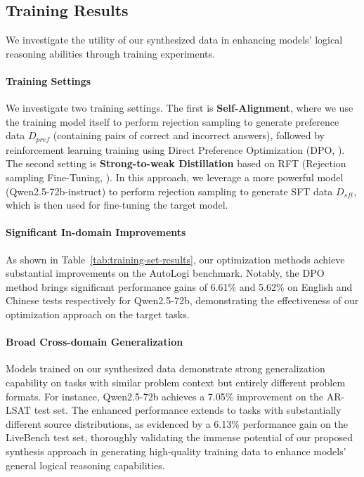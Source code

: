 \subsection{Training Results}
We investigate the utility of our synthesized data in enhancing models' logical reasoning abilities through training experiments.

\paragraph{Training Settings}
We investigate two training settings. The first is \textbf{Self-Alignment}, where we use the training model itself to perform rejection sampling to generate preference data $D_{pref}$ (containing pairs of correct and incorrect answers), followed by reinforcement learning training using Direct Preference Optimization (DPO, \citealp{rafailov2024directpreferenceoptimizationlanguage}).
The second setting is \textbf{Strong-to-weak Distillation} based on RFT (Rejection sampling Fine-Tuning,  \citealp{yuan2023scalingrelationshiplearningmathematical}). In this approach, we leverage a more powerful model (Qwen2.5-72b-instruct) to perform rejection sampling to generate SFT data $D_{sft}$, which is then used for fine-tuning the target model.

\paragraph{Significant In-domain Improvements}
As shown in Table~\ref{tab:training-set-results}, our optimization methods achieve substantial improvements on the AutoLogi benchmark. Notably, the DPO method brings significant performance gains of 6.61\% and 5.62\% on English and Chinese tests respectively for Qwen2.5-72b, demonstrating the effectiveness of our optimization approach on the target tasks.

\paragraph{Broad Cross-domain Generalization}
Models trained on our synthesized data demonstrate strong generalization capability on tasks with similar problem context but entirely different problem formats. For instance, Qwen2.5-72b achieves a 7.05\% improvement on the AR-LSAT test set. The enhanced performance extends to tasks with substantially different source distributions, as evidenced by a 6.13\% performance gain on the LiveBench test set, thoroughly validating the immense potential of our proposed synthesis approach in generating high-quality training data to enhance models' general logical reasoning capabilities.

